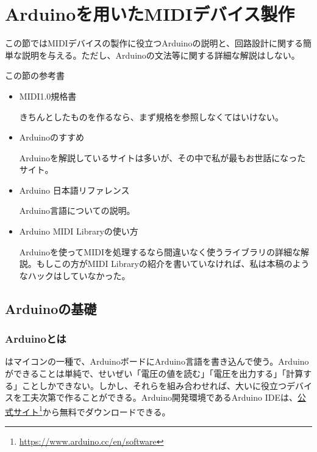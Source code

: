 \documentclass[uplatex, 10pt, dvipdfmx]{jsarticle}
\numberwithin{equation}{section}
\newcommand{\emphj}[1]{\textbf{\textrm{\textgt{{#1}}}}}
\begin{document}
\clearpage

\section{Arduinoを用いたMIDIデバイス製作}
この節ではMIDIデバイスの製作に役立つArduinoの説明と、回路設計に関する簡単な説明を与える。ただし、Arduinoの文法等に関する詳細な解説はしない。
\begin{itembox}{この節の参考書}
\begin{itemize}
\item MIDI1.0規格書\cite{規格}

きちんとしたものを作るなら、まず規格を参照しなくてはいけない。

\item Arduinoのすすめ\cite{Arduinoのすすめ}

Arduinoを解説しているサイトは多いが、その中で私が最もお世話になったサイト。

\item Arduino 日本語リファレンス\cite{Arduinoリファレンス}

Arduino言語についての説明。

\item Arduino MIDI Libraryの使い方\cite{ArduinoMIDILib}

Arduinoを使ってMIDIを処理するなら間違いなく使うライブラリの詳細な解説。もしこの方がMIDI Libraryの紹介を書いていなければ、私は本稿のようなハックはしていなかった。
\end{itemize}
\end{itembox}

\subsection{Arduinoの基礎}
\subsubsection{Arduinoとは}
\emphj{Arduino}はマイコンの一種で、ArduinoボードにArduino言語を書き込んで使う。Arduinoができることは単純で、せいぜい「電圧の値を読む」「電圧を出力する」「計算する」ことしかできない。しかし、それらを組み合わせれば、大いに役立つデバイスを工夫次第で作ることができる。Arduino開発環境であるArduino IDEは、\href{https://www.arduino.cc/en/software}{公式サイト}\footnote{\url{https://www.arduino.cc/en/software}}から無料でダウンロードできる。
\end{document}

